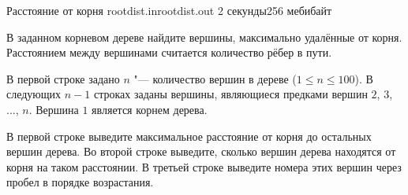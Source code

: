 \begin{problem}{Расстояние от корня}
{rootdist.in}{rootdist.out}
{2 секунды}{256 мебибайт}{}

В заданном корневом дереве найдите вершины, максимально удалённые
от корня. Расстоянием между вершинами считается количество рёбер в пути.

\InputFile

В первой строке задано $n$ "--- количество вершин в дереве ($1 \le n \le 100$).
В следующих $n - 1$ строках заданы вершины, являющиеся предками
вершин $2$, $3$, $\ldots$, $n$. Вершина $1$ является корнем дерева.

\OutputFile

В первой строке выведите максимальное расстояние от корня до остальных
вершин дерева.
Во второй строке выведите, сколько вершин дерева находятся от корня
на таком расстоянии.
В третьей строке выведите номера этих вершин через пробел
в порядке возрастания.

\Examples

\begin{example}
%
%
\end{example}

\end{problem}
